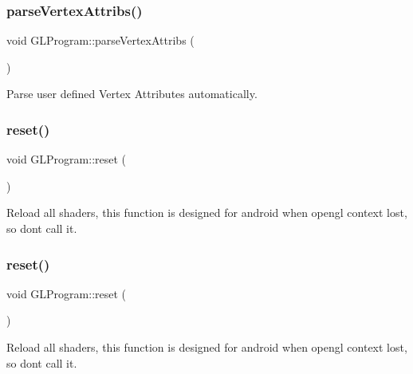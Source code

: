 \subsubsection{\texorpdfstring{parse\+Vertex\+Attribs()}{parseVertexAttribs()}\hspace{0.1cm}{\footnotesize\ttfamily [2/2]}}
{\footnotesize\ttfamily void G\+L\+Program\+::parse\+Vertex\+Attribs (\begin{DoxyParamCaption}{ }\end{DoxyParamCaption})\hspace{0.3cm}{\ttfamily [protected]}}

Parse user defined Vertex Attributes automatically. \mbox{\label{classGLProgram_a457db5fbd837470d94157e4a0a525859}} 
\subsubsection{\texorpdfstring{reset()}{reset()}\hspace{0.1cm}{\footnotesize\ttfamily [1/2]}}
{\footnotesize\ttfamily void G\+L\+Program\+::reset (\begin{DoxyParamCaption}{ }\end{DoxyParamCaption})}

Reload all shaders, this function is designed for android when opengl context lost, so don\textquotesingle{}t call it. \mbox{\label{classGLProgram_a457db5fbd837470d94157e4a0a525859}} 
\subsubsection{\texorpdfstring{reset()}{reset()}\hspace{0.1cm}{\footnotesize\ttfamily [2/2]}}
{\footnotesize\ttfamily void G\+L\+Program\+::reset (\begin{DoxyParamCaption}{ }\end{DoxyParamCaption})}

Reload all shaders, this function is designed for android when opengl context lost, so don\textquotesingle{}t call it. \mbox{\label{classGLProgram_a1ad9ce5ccc8d957fe9e01d71ce9560f2}} 
